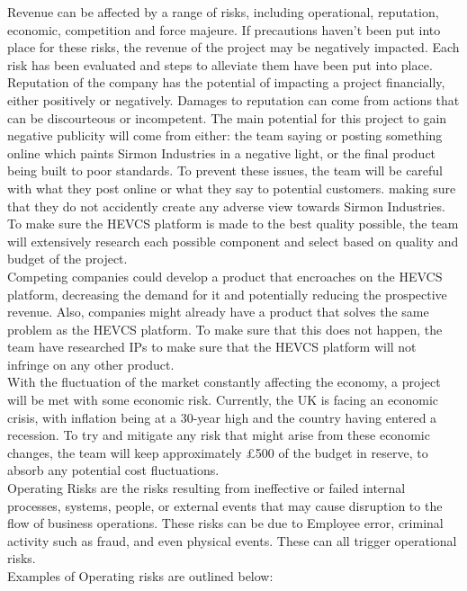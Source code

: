 \documentclass [12pt]{article}
\begin{document}
Revenue can be affected by a range of risks, including operational, reputation, economic, competition and force majeure. If precautions haven’t been put into place for these risks, the revenue of the project may be negatively impacted. Each risk has been evaluated and steps to alleviate them have been put into place.
\\
Reputation of the company has the potential of impacting a project financially, either positively or negatively. Damages to reputation can come from actions that can be discourteous or incompetent. The main potential for this project to gain negative publicity will come from either: the team saying or posting something online which paints Sirmon Industries in a negative light, or the final product being built to poor standards. To prevent these issues, the team will be careful with what they post online or what they say to potential customers. making sure that they do not accidently create any adverse view towards Sirmon Industries. To make sure the HEVCS platform is made to the best quality possible, the team will extensively research each possible component and select based on quality and budget of the project.
\\
Competing companies could develop a product that encroaches on the HEVCS platform, decreasing the demand for it and potentially reducing the prospective revenue. Also, companies might already have a product that solves the same problem as the HEVCS platform. To make sure that this does not happen, the team have researched IPs to make sure that the HEVCS platform will not infringe on any other product.
\\
With the fluctuation of the market constantly affecting the economy, a project will be met with some economic risk. Currently, the UK is facing an economic crisis, with inflation being at a 30-year high and the country having entered a recession. To try and mitigate any risk that might arise from these economic changes, the team will keep approximately £500 of the budget in reserve, to absorb any potential cost fluctuations.   
\\
Operating Risks are the risks resulting from ineffective or failed internal processes, systems, people, or external events that may cause disruption to the flow of business operations. These risks can be due to Employee error, criminal activity such as fraud, and even physical events. These can all trigger operational risks. 
\\
Examples of Operating risks are outlined below:
\end{document}
